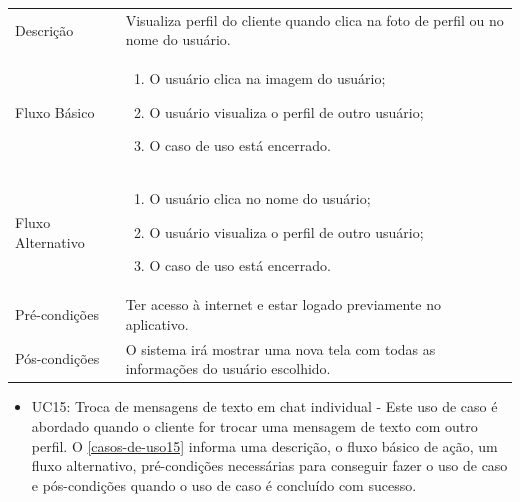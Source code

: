 
\begin{quadro}[htb]
	\centering
	\ABNTEXfontereduzida
	\caption[Caso de Uso Visualizar Perfil dos usuários]{Caso de Uso Visualizar Perfil dos usuários}
	\label{casos-de-uso14}
\end{quadro}
\begin{longtable}{|p{3.3cm}|p{12.3cm}|}
	\hline
	\thead{} & \thead{Ator} \\
	\hline
	Descrição & Visualiza perfil do cliente quando clica na foto de perfil ou no nome do usuário.\\
	\hline
	Fluxo Básico  & 
	\begin{enumerate}
		\item O usuário clica na imagem do usuário;
		\item O usuário visualiza o perfil de outro usuário;
		\item O caso de uso está encerrado.
	\end{enumerate}\\
	\hline
	Fluxo Alternativo & 
	\begin{enumerate}
		\item O usuário clica no nome do usuário;
		\item O usuário visualiza o perfil de outro usuário;
		\item O caso de uso está encerrado.
	\end{enumerate}\\
	\hline
	Pré-condições & Ter acesso à internet e estar logado previamente no aplicativo.\\
	\hline
	Pós-condições & O sistema irá mostrar uma nova tela com todas as informações do usuário escolhido.\\
	\hline
\end{longtable}
\pagebreak


\begin{itemize}
	\item UC15: Troca de mensagens de texto em chat individual - Este uso de caso é abordado quando o cliente for trocar uma mensagem de texto com outro perfil. O \autoref{casos-de-uso15} informa uma descrição, o fluxo básico de ação, um fluxo alternativo, pré-condições necessárias para conseguir fazer o uso de caso e pós-condições quando o uso de caso é concluído com sucesso.\\
\end{itemize}

